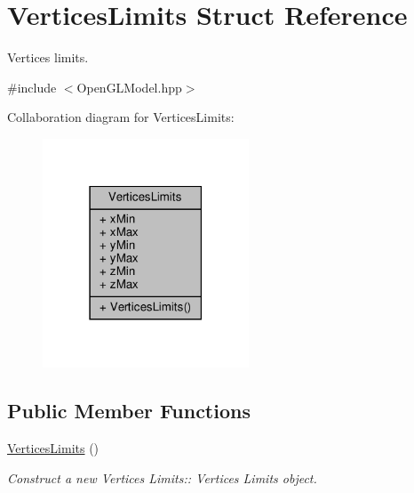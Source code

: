 \hypertarget{struct_vertices_limits}{}\section{Vertices\+Limits Struct Reference}
\label{struct_vertices_limits}


Vertices limits.  




{\ttfamily \#include $<$Open\+G\+L\+Model.\+hpp$>$}



Collaboration diagram for Vertices\+Limits\+:
\nopagebreak
\begin{figure}[H]
\begin{center}
\leavevmode
\includegraphics[width=174pt]{struct_vertices_limits__coll__graph}
\end{center}
\end{figure}
\subsection*{Public Member Functions}
\begin{DoxyCompactItemize}
\item 
\mbox{\label{struct_vertices_limits_ae17a671eb1d7eb3eec5c490f40dcb179}} 
\hyperlink{struct_vertices_limits_ae17a671eb1d7eb3eec5c490f40dcb179}{Vertices\+Limits} ()
\begin{DoxyCompactList}\small\item\em Construct a new Vertices Limits\+:\+: Vertices Limits object. \end{DoxyCompactList}\end{DoxyCompactItemize}

